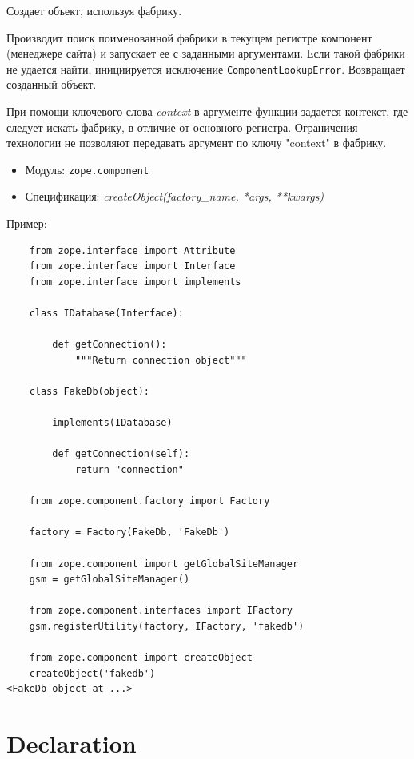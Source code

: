 \documentclass[a4paper,openany,twoside,final]{book}
\providecommand*{\DUroletitlereference}[1]{\textsl{#1}}
\begin{document}
Создает объект, используя фабрику.

Производит поиск поименованной фабрики в текущем регистре компонент (менеджере сайта) и запускает ее с заданными аргументами.  Если такой фабрики не удается найти, инициируется исключение \texttt{ComponentLookupError}.  Возвращает созданный объект.

При помощи ключевого слова \DUroletitlereference{context} в аргументе функции задается контекст, где следует искать фабрику, в отличие от основного регистра.  Ограничения технологии не позволяют передавать аргумент по ключу "context" в фабрику.

\begin{itemize}

\item Модуль: \texttt{zope.component}

\item Спецификация: \DUroletitlereference{createObject(factory\_name, *args, **kwargs)}

\end{itemize}

Пример:

\begin{verbatim}
    from zope.interface import Attribute
    from zope.interface import Interface
    from zope.interface import implements

    class IDatabase(Interface):

        def getConnection():
            """Return connection object"""

    class FakeDb(object):

        implements(IDatabase)

        def getConnection(self):
            return "connection"

    from zope.component.factory import Factory

    factory = Factory(FakeDb, 'FakeDb')

    from zope.component import getGlobalSiteManager
    gsm = getGlobalSiteManager()

    from zope.component.interfaces import IFactory
    gsm.registerUtility(factory, IFactory, 'fakedb')

    from zope.component import createObject
    createObject('fakedb')
<FakeDb object at ...>
\end{verbatim}


\section*{Declaration%
  \label{declaration}%
}
\end{document}
